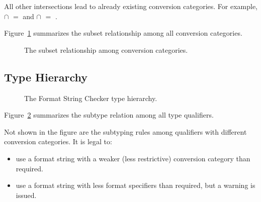 \noindent All other intersections lead to already existing conversion categories.
For example,  $\cap$  $=$  and 
 $\cap$  $=$ .

Figure~\ref{fig:formatter-cat} summarizes the subset 
relationship among all conversion categories.

\begin{figure}[thbp]
    \caption{The subset relationship among conversion categories.}
    \label{fig:formatter-cat}
\end{figure}

\subsection{Type Hierarchy}

\begin{figure}[thbp]
\caption{The Format String Checker type hierarchy.}
\label{fig:formatter-th}
\end{figure}

\noindent Figure~\ref{fig:formatter-th} summarizes the subtype relation among all type
qualifiers.  

% 

Not shown in the figure are the subtyping rules among  qualifiers
with different conversion categories. It is legal to:

\begin{itemize}
\item use a format string with a weaker (less restrictive) conversion category than required.
\item use a format string with less format specifiers than required, but a warning is issued. 
\end{itemize}

